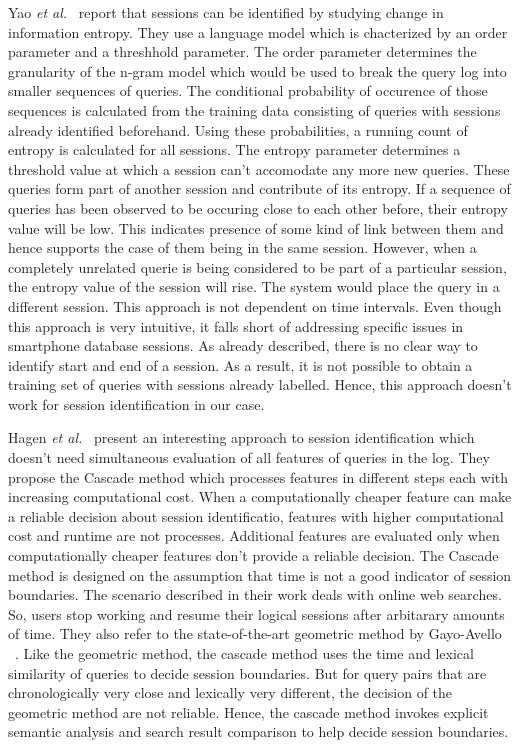 Yao \textit{et al.}~\cite{huang2006} report that sessions can be identified by studying change in information entropy. They use a language model which is chacterized by an order parameter and a threshhold parameter. The order parameter determines the granularity of the n-gram model which would be used to break the query log into smaller sequences of queries. The conditional probability of occurence of those sequences is calculated from the training data consisting of queries with sessions already identified beforehand. Using these probabilities, a running count of entropy is calculated for all sessions. The entropy parameter determines a threshold value at which a session can't accomodate any more new queries. These queries form part of another session and contribute of its entropy. If a sequence of queries has been observed to be occuring close to each other before, their entropy value will be low. This indicates presence of some kind of link between them and hence supports the case of them being in the same session. However, when a completely unrelated querie is being considered to be part of a particular session, the entropy value of the session will rise. The system would place the query in a different session. This approach is not dependent on time intervals. Even though this approach is very intuitive, it falls short of addressing specific issues in smartphone database sessions. As already described, there is no clear way to identify start and end of a session. As a result, it is not possible to obtain a training set of queries with sessions already labelled. Hence, this approach doesn't work for session identification in our case.

Hagen \textit{et al.}~\cite{hagen2011query} present an interesting approach to session identification which doesn't need simultaneous evaluation of all features of queries in the log. They propose the Cascade method which processes features in different steps each with increasing computational cost. When a computationally cheaper feature can make a reliable decision about session identificatio, features with higher computational cost and runtime are not processes. Additional features are evaluated only when computationally cheaper features don't provide a reliable decision. The Cascade method is designed on the assumption that time is not a good indicator of session boundaries. The scenario described in their work deals with online web searches. So, users stop working and resume their logical sessions after arbitarary amounts of time. 
They also refer to the state-of-the-art geometric method by Gayo-Avello ~\cite{gayo2009survey}. Like the geometric method, the cascade method uses the time and lexical similarity of queries to decide session boundaries. But for query pairs that are chronologically very close and lexically very different, the decision of the geometric method are not reliable. Hence, the cascade method invokes explicit semantic analysis and search result comparison to help decide session boundaries.  

